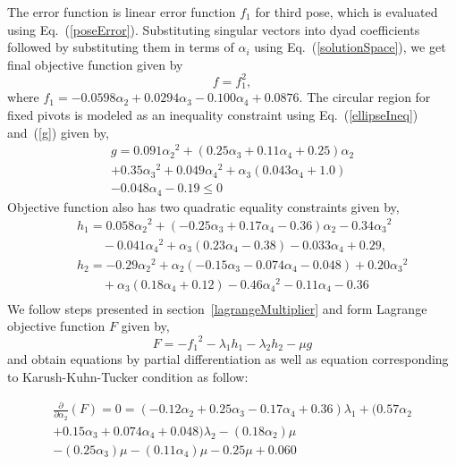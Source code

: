 \documentclass[twocolumn,10pt]{asme2ej}
\newcommand{\req}[1]{(\ref{#1})}
\begin{document}
The error function is linear error function $f_1$ for third pose, which is evaluated using Eq.~\req{poseError}. Substituting singular vectors into dyad coefficients followed by substituting them in terms of $\alpha_i$ using Eq.~\req{solutionSpace}, we get final objective function given by
\begin{equation}
f = f_1^2,
\end{equation}
where $f_1 = -0.0598 {\alpha_2}+0.0294 {\alpha_3}-0.100 {\alpha_4}+0.0876$.
The circular region for fixed pivots is modeled as an inequality constraint using Eq.~\req{ellipseIneq} and~\req{g} given by,
\begin{equation}
\begin{array}{c}
g = 0.091 {\alpha_2}^2+(0.25 {\alpha_3}+0.11 {\alpha_4}+0.25) {\alpha_2}\\+0.35 {\alpha_3}^2+0.049 {\alpha_4}^2+{\alpha_3} (0.043 {\alpha_4}+1.0)\\-0.048 {\alpha_4}-0.19 \leq 0
\end{array}
\end{equation}
Objective function also has two quadratic equality constraints given by,
\begin{eqnarray}
& & h_1 = 0.058 {\alpha_2}^2+(-0.25 {\alpha_3}+0.17 {\alpha_4}-0.36) {\alpha_2} -0.34 {\alpha_3}^2  \nonumber \\
& & \ \ \ \ \ \ \ \ \  -0.041 {\alpha_4}^2+{\alpha_3} (0.23 {\alpha_4}-0.38)-0.033 {\alpha_4}+0.29, \nonumber \\
& & h_2  = -0.29 {\alpha_2}^2+{\alpha_2} (-0.15 {\alpha_3}-0.074 {\alpha_4}-0.048)+0.20 {\alpha_3}^2 \nonumber \\
& & \ \ \ \ \ \ \ \ \  +{\alpha_3} (0.18 {\alpha_4}+0.12)-0.46 {\alpha_4}^2-0.11 {\alpha_4}-0.36 \nonumber \\
\end{eqnarray}
We follow steps presented in section~\ref{lagrangeMultiplier} and form Lagrange objective function $F$ given by,
\begin{equation}
F = -{f_1}^2- \lambda_1h_1 -  \lambda_2h_2 - \mu g
\end{equation}
and obtain equations by partial differentiation as well as equation corresponding to Karush-Kuhn-Tucker condition as follow:

\begin{equation}
\begin{array}{c}
\frac{\partial}{\partial \alpha_2}(F) = 0 = (-0.12 {\alpha_2}+0.25 {\alpha_3}-0.17 {\alpha_4}+0.36) {\lambda_1}+(0.57 {\alpha_2}\\+0.15 {\alpha_3}+0.074 {\alpha_4}+0.048) {\lambda_2}-(0.18 {\alpha_2}) \mu \\-(0.25 {\alpha_3}) \mu -(0.11 {\alpha_4}) \mu -0.25 \mu +0.060
\end{array}
\end{equation}
\end{document}
